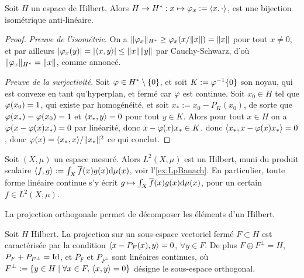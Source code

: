 \begin{theorem}
\label{th:reprRiesz}
%
Soit $H$ un espace de Hilbert. Alors $H \to H^* : x \mapsto \varphi_x := \langle x,\cdot\rangle$, est une bijection isométrique anti-linéaire.  
\end{theorem}

\begin{proof}
	\emph{Preuve de l'isométrie}. On a $\|\varphi_x\|_{H^*} \geq \varphi_x( x/\|x\|) = \|x\|$ pour tout $x \neq 0$, et par ailleurs $|\varphi_x(y)| = |\langle x,y\rangle| \leq \|x\| \|y\|$ par Cauchy-Schwarz, d'où $\|\varphi_x\|_{H^*} = \|x\|$, comme annoncé.
	
	\emph{Preuve de la surjectivité}. Soit $\varphi \in H^*\setminus \{0\}$, et soit $K := \varphi^{-1}\{0\}$ son noyau, qui est convexe en tant qu'hyperplan, et fermé car $\varphi$ est continue. 
	Soit $x_0\in H$ tel que $\varphi(x_0)=1$, qui existe par homogénéité, et soit $x_* := x_0 - P_K(x_0)$, de sorte que $\varphi(x_*) = \varphi(x_0) = 1$ et $\langle x_*,y\rangle = 0$ pour tout $y \in K$. Alors pour tout $x\in H$ on a $\varphi(x-\varphi(x) x_*) = 0$ par linéarité, donc $x-\varphi(x) x_* \in K$, donc $\langle x_*,x-\varphi(x) x_*\rangle = 0$, donc $\varphi(x) = \langle x_*,x\rangle/\|x_*\|^2$ ce qui conclut. 
\end{proof}

\begin{exemple}
\label{ex:l2Hilbert}
%
	Soit $(X,\mu)$ un espace mesuré. Alors $L^2(X,\mu)$ est un Hilbert, muni du produit scalaire $\langle f,g\rangle := \int_X \overline f(x) g(x) \mathrm{d}\mu(x)$, voir l'\cref{ex:LpBanach}. En particulier, toute forme linéaire continue s'y écrit $g \mapsto \int_X \overline f(x) g(x) \mathrm{d}\mu(x)$, pour un certain $f \in L^2(X, \mu)$.
\end{exemple}

La projection orthogonale permet de décomposer les éléments d'un Hilbert.

\begin{proposition}
\label{prop:decompOrth}
%
	Soit $H$ Hilbert. 
	La projection sur un sous-espace vectoriel fermé $F \subset H$ est caractérisée par la condition $\langle x-P_F(x),y\rangle = 0$, $\forall y \in F$.
	De plus $F \oplus F^\perp = H$, $P_F+P_{F^\perp} = \operatorname{Id}$, et $P_F$ et $P_{F^\perp}$ sont linéaires continues, où $F^\perp := \{y \in H \mid \forall x \in F,\, \langle x,y\rangle=0\}$ désigne le sous-espace orthogonal.
\end{proposition}


